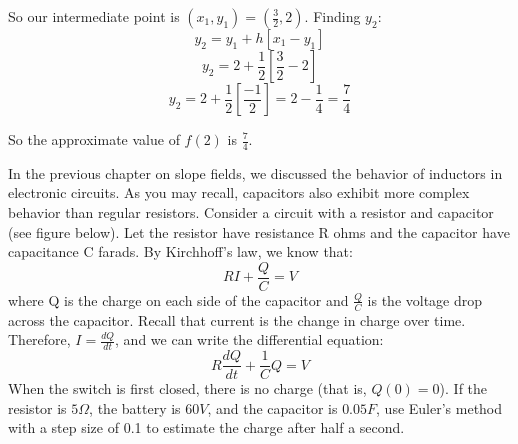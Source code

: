 So our intermediate point is $(x_1, y_1) = (\frac{3}{2}, 2)$. Finding $y_2$:
$$y_2 = y_1 + h \left[x_1 - y_1 \right]$$
$$y_2 = 2 + \frac{1}{2} \left[ \frac{3}{2} - 2 \right]$$
$$y_2 = 2 + \frac{1}{2} \left[\frac{-1}{2} \right] = 2 - \frac{1}{4} 
= \frac{7}{4}$$

So the approximate value of $f(2)$ is $\frac{7}{4}$.

\begin{Exercise}[label = eulercircuit]

In the previous chapter on slope fields, we discussed the behavior of inductors in electronic circuits. As you may recall, capacitors also exhibit more complex behavior than regular resistors. Consider a circuit with a resistor and capacitor (see figure below). Let the resistor have resistance R ohms and the capacitor have capacitance C farads. By Kirchhoff's law, we know that:
$$RI + \frac{Q}{C} = V$$
where Q is the charge on each side of the capacitor and $\frac{Q}{C}$ is the voltage drop across the capacitor. Recall that current is the change in charge over time. Therefore, $I = \frac{dQ}{dt}$, and we can write the differential equation:
$$R \frac{dQ}{dt} + \frac{1}{C}Q = V$$
When the switch is first closed, there is no charge (that is, $Q(0) = 0$). If the resistor is $5 \Omega$, the battery is $60 V$, and the capacitor is $0.05 F$, use Euler's method with a step size of 0.1 to estimate the charge after half a second. 

\end{Exercise}

